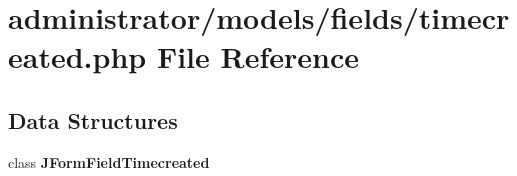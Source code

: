 \section{administrator/models/fields/timecreated.php File Reference}
\label{administrator_2models_2fields_2timecreated_8php}
\subsection*{Data Structures}
\begin{DoxyCompactItemize}
\item 
class \textbf{ J\+Form\+Field\+Timecreated}
\end{DoxyCompactItemize}
